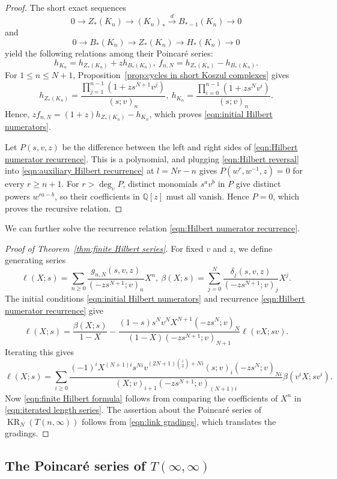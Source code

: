\documentclass[reqno]{amsart}
\theoremstyle{definition}
\theoremstyle{remark}
\newcommand{\QQ}{\mathbb{Q}}
\DeclareMathOperator{\KR}{KR}
\begin{document}
\begin{proof}
The short exact sequences \[0\to Z_*(K_n)\to(K_n)_*\xrightarrow{d}B_{*-1}(K_n)\to0\]and\[0\to B_*(K_n)\to Z_*(K_n)\to H_*(K_n)\to0\]yield the following relations among their Poincar\'e series:
\[h_{K_n}=h_{Z_*(K_n)}+zh_{B_*(K_n)},\ f_{n,N}=h_{Z_*(K_n)}-h_{B_*(K_n)}.\]For $1\le n\le N+1$, Proposition~\ref{prop:cycles in short Koszul complexes} gives \[h_{Z_*(K_n)}=\frac{\prod_{j=1}^{n-1}(1+zs^{N+1}v^j)}{(s;v)_n},\ h_{K_n}=\frac{\prod_{i=0}^{n-1}(1+zs^Nv^i)}{(s;v)_n}.\]Hence, $zf_{n,N}=(1+z)h_{Z_*(K_n)}-h_{K_n}$, which proves \eqref{eqn:initial Hilbert numerators}.

Let $P(s,v,z)$ be the difference between the left and right sides of \eqref{eqn:Hilbert numerator recurrence}. This is a polynomial, and plugging \eqref{eqn:Hilbert reversal} into \eqref{eqn:auxiliary Hilbert recurrence} at $l=Nr-n$ gives $P(w^r,w^{-1},z)=0$ for every $r\ge n+1$. For $r>\deg_vP$, distinct monomials $s^av^b$ in $P$ give distinct powers $w^{ra-b}$, so their coefficients in $\QQ[z]$ must all vanish. Hence $P=0$, which proves the recursive relation.
\end{proof}

We can further solve the recurrence relation \eqref{eqn:Hilbert numerator recurrence}.

\begin{proof}[Proof of Theorem~\ref{thm:finite Hilbert series}]
For fixed $v$ and $z$, we define generating series
\[\ell(X;s)=\sum_{n\ge0}\frac{g_{n,N}(s,v,z)}{(-zs^{N+1};v)_n}X^n,\ \beta(X;s)=\sum_{j=0}^N\frac{\delta_j(s,v,z)}{(-zs^{N+1};v)_j}X^j.\]
The initial conditions \eqref{eqn:initial Hilbert numerators} and recurrence \eqref{eqn:Hilbert numerator recurrence} give
\[\ell(X;s)=\frac{\beta(X;s)}{1-X}-\frac{(1-s)s^Nv^NX^{N+1}(-zs^N;v)_N}{(1-X)(-zs^{N+1};v)_{N+1}}\ell(vX;sv).\]
Iterating this gives
\begin{equation}\label{eqn:iterated length series}
\ell(X;s)=\sum_{i\ge0}\frac{(-1)^iX^{(N+1)i}s^{Ni}v^{(2N+1)\binom{i}{2}+Ni}(s;v)_i(-zs^N;v)_{Ni}}{(X;v)_{i+1}(-zs^{N+1};v)_{(N+1)i}}\beta(v^iX;sv^i).
\end{equation}
Now \eqref{eqn:finite Hilbert formula} follows from comparing the coefficients of $X^n$ in \eqref{eqn:iterated length series}. The assertion about the Poincar\'e series of $\KR_N(T(n,\infty))$ follows from \eqref{eqn:link gradings}, which translates the gradings.
\end{proof}

\subsection{\texorpdfstring{The Poincar\'e series of $T(\infty,\infty)$}{The Poincaré series of T(infinity,infinity)}}
\end{document}

